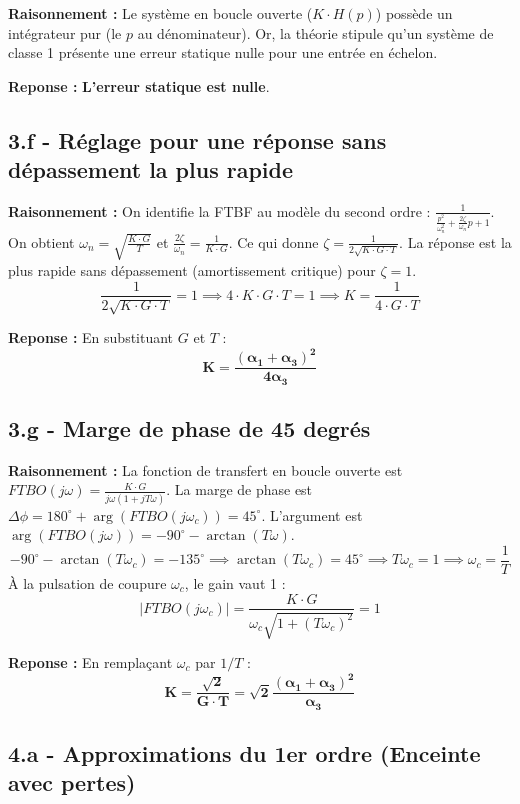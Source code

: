 \documentclass[11pt,a4paper]{article}
\begin{document}
\textbf{Raisonnement :} Le système en boucle ouverte ($K \cdot H(p)$) possède un intégrateur pur (le $p$ au dénominateur). Or, la théorie stipule qu'un système de classe 1 présente une erreur statique nulle pour une entrée en échelon.

\textbf{Reponse :} \textbf{L'erreur statique est nulle}.

\subsection*{3.f - Réglage pour une réponse sans dépassement la plus rapide}

\textbf{Raisonnement :} On identifie la FTBF au modèle du second ordre : $\frac{1}{\frac{p^2}{\omega_n^2} + \frac{2\zeta}{\omega_n}p + 1}$.
On obtient $\omega_n = \sqrt{\frac{K \cdot G}{T}}$ et $\frac{2\zeta}{\omega_n} = \frac{1}{K \cdot G}$.
Ce qui donne $\zeta = \frac{1}{2\sqrt{K \cdot G \cdot T}}$.
La réponse est la plus rapide sans dépassement (amortissement critique) pour $\zeta = 1$.
$$ \frac{1}{2\sqrt{K \cdot G \cdot T}} = 1 \implies 4 \cdot K \cdot G \cdot T = 1 \implies K = \frac{1}{4 \cdot G \cdot T} $$

\textbf{Reponse :} En substituant $G$ et $T$ :
$$ 
\mathbf{K = \frac{(\alpha_1 + \alpha_3)^2}{4\alpha_3}} 
$$

\subsection*{3.g - Marge de phase de 45 degrés}

\textbf{Raisonnement :} La fonction de transfert en boucle ouverte est $FTBO(j\omega) = \frac{K \cdot G}{j\omega(1 + jT\omega)}$.
La marge de phase est $\Delta\phi = 180^\circ + \arg(FTBO(j\omega_c)) = 45^\circ$.
L'argument est $\arg(FTBO(j\omega)) = -90^\circ - \arctan(T\omega)$.
$$ -90^\circ - \arctan(T\omega_c) = -135^\circ \implies \arctan(T\omega_c) = 45^\circ \implies T\omega_c = 1 \implies \omega_c = \frac{1}{T} $$
À la pulsation de coupure $\omega_c$, le gain vaut 1 :
$$ |FTBO(j\omega_c)| = \frac{K \cdot G}{\omega_c \sqrt{1 + (T\omega_c)^2}} = 1 $$

\textbf{Reponse :} En remplaçant $\omega_c$ par $1/T$ :
$$ 
\mathbf{K = \frac{\sqrt{2}}{G \cdot T} = \sqrt{2} \frac{(\alpha_1 + \alpha_3)^2}{\alpha_3}} 
$$

\subsection*{4.a - Approximations du 1er ordre (Enceinte avec pertes)}
\end{document}
